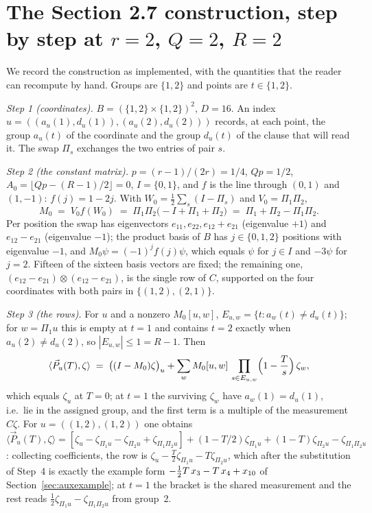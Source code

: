 \documentclass[11pt]{article}
\theoremstyle{definition}
\theoremstyle{remark}
\newcommand{\angles}[1]{\langle #1 \rangle}
\begin{document}



\appendix

\section{The Section 2.7 construction, step by step at $r = 2$, $Q = 2$, $R = 2$}\label{app:aux}

We record the construction as implemented, with the quantities that the reader can recompute by hand. Groups are $\{1, 2\}$ and points are $t \in \{1, 2\}$.

\emph{Step 1 (coordinates).} $B = (\{1,2\} \times \{1,2\})^2$, $D = 16$. An index $u = ((a_u(1), d_u(1)), (a_u(2), d_u(2)))$ records, at each point, the group $a_u(t)$ of the coordinate and the group $d_u(t)$ of the clause that will read it. The swap $\Pi_s$ exchanges the two entries of pair $s$.

\emph{Step 2 (the constant matrix).} $p = (r-1)/(2r) = 1/4$, $Qp = 1/2$, $A_0 = \lfloor Qp - (R-1)/2 \rfloor = 0$, $I = \{0, 1\}$, and $f$ is the line through $(0, 1)$ and $(1, -1)$: $f(j) = 1 - 2j$. With $W_0 = \tfrac12\sum_s (I - \Pi_s)$ and $V_0 = \Pi_1 \Pi_2$,
\[
M_0 \;=\; V_0 f(W_0) \;=\; \Pi_1\Pi_2\bigl(-I + \Pi_1 + \Pi_2\bigr) \;=\; \Pi_1 + \Pi_2 - \Pi_1\Pi_2 .
\]
Per position the swap has eigenvectors $e_{11}, e_{22}, e_{12} + e_{21}$ (eigenvalue $+1$) and $e_{12} - e_{21}$ (eigenvalue $-1$); the product basis of $B$ has $j \in \{0, 1, 2\}$ positions with eigenvalue $-1$, and $M_0 \psi = (-1)^j f(j) \psi$, which equals $\psi$ for $j \in I$ and $-3\psi$ for $j = 2$. Fifteen of the sixteen basis vectors are fixed; the remaining one, $(e_{12} - e_{21}) \otimes (e_{12} - e_{21})$, is the single row of $C$, supported on the four coordinates with both pairs in $\{(1,2), (2,1)\}$.

\emph{Step 3 (the rows).} For $u$ and a nonzero $M_0[u, w]$, $E_{u,w} = \{t : a_w(t) \ne d_u(t)\}$; for $w = \Pi_1 u$ this is empty at $t = 1$ and contains $t = 2$ exactly when $a_u(2) \ne d_u(2)$, so $|E_{u,w}| \le 1 = R - 1$. Then
\[
\angles{\vec P_u(T), \zeta} \;=\; \bigl((I - M_0)\zeta\bigr)_u + \sum_{w} M_0[u,w]\, \prod_{s \in E_{u,w}} \Bigl(1 - \frac{T}{s}\Bigr)\, \zeta_w ,
\]
which equals $\zeta_u$ at $T = 0$; at $t = 1$ the surviving $\zeta_w$ have $a_w(1) = d_u(1)$, i.e.\ lie in the assigned group, and the first term is a multiple of the measurement $C\zeta$. For $u = ((1,2),(1,2))$ one obtains $\angles{\vec P_u(T), \zeta} = [\zeta_u - \zeta_{\Pi_1 u} - \zeta_{\Pi_2 u} + \zeta_{\Pi_1\Pi_2 u}] + (1 - T/2)\zeta_{\Pi_1 u} + (1 - T)\zeta_{\Pi_2 u} - \zeta_{\Pi_1 \Pi_2 u}$: collecting coefficients, the row is $\zeta_u - \tfrac{T}{2}\zeta_{\Pi_1 u} - T\zeta_{\Pi_2 u}$, which after the substitution of Step~4 is exactly the example form $-\tfrac{1}{2}T\,x_{3} - T\,x_{4} + x_{10}$ of Section~\ref{sec:auxexample}; at $t = 1$ the bracket is the shared measurement and the rest reads $\tfrac12 \zeta_{\Pi_1 u} - \zeta_{\Pi_1\Pi_2 u}$ from group~2.
\end{document}
